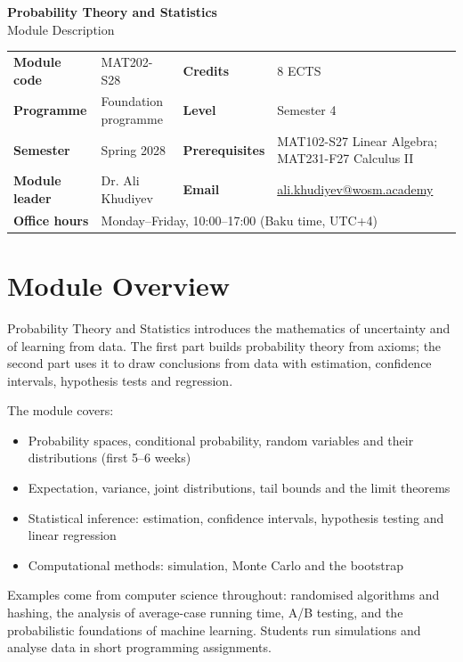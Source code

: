 \documentclass[11pt,a4paper]{article}
\makeatletter
\newcommand{\ModuleTitle}{Probability Theory and Statistics}
\newcommand{\ModuleCode}{MAT202-S28}
\newcommand{\Programme}{Foundation programme}
\newcommand{\Level}{Semester 4}
\newcommand{\Semester}{Spring 2028}
\newcommand{\Credits}{8 ECTS}
\newcommand{\ModuleLeader}{Dr. Ali Khudiyev}
\newcommand{\Email}{ali.khudiyev@wosm.academy}
\newcommand{\OfficeHours}{Monday--Friday, 10:00--17:00 (Baku time, UTC+4)}
\newcommand{\Prerequisites}{MAT102-S27 Linear Algebra; MAT231-F27 Calculus II}
\makeatother
\begin{document}
\begin{center}
  {\LARGE\bfseries\color{accent} \ModuleTitle}\\[4pt]
  {\large Module Description}
\end{center}
\vspace{6pt}

\begin{tabularx}{\textwidth}{>{\bfseries}l X >{\bfseries}l X}
\toprule
Module code   & \ModuleCode    & Credits      & \Credits \\
Programme     & \Programme     & Level        & \Level \\
Semester      & \Semester      & Prerequisites & \Prerequisites \\
Module leader & \ModuleLeader  & Email        & \href{mailto:\Email}{\Email} \\
Office hours  & \multicolumn{3}{l}{\OfficeHours} \\
\bottomrule
\end{tabularx}

\section{Module Overview}
Probability Theory and Statistics introduces the mathematics of uncertainty and
of learning from data. The first part builds probability theory from axioms;
the second part uses it to draw conclusions from data with estimation, confidence
intervals, hypothesis tests and regression.

The module covers:
\begin{itemize}
  \item Probability spaces, conditional probability, random variables and their
        distributions (first 5--6 weeks)
  \item Expectation, variance, joint distributions, tail bounds and the limit
        theorems
  \item Statistical inference: estimation, confidence intervals, hypothesis testing
        and linear regression
  \item Computational methods: simulation, Monte Carlo and the bootstrap
\end{itemize}

Examples come from computer science throughout: randomised algorithms and hashing,
the analysis of average-case running time, A/B testing, and the probabilistic
foundations of machine learning. Students run simulations and analyse data in
short programming assignments.
\end{document}
